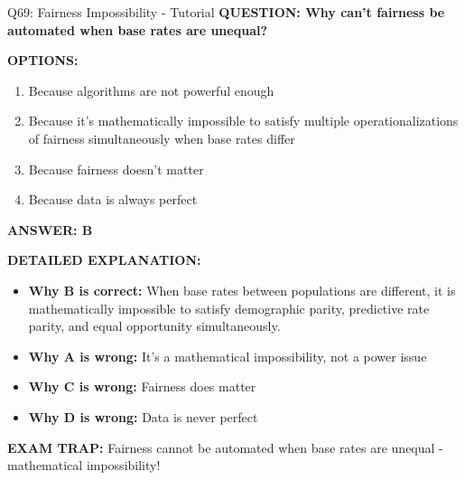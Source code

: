 \documentclass[8pt]{beamer}
\begin{document}
	\begin{frame}{Q69: Fairness Impossibility - Tutorial}
		\fontsize{6.5}{7.5}\selectfont
		\textbf{QUESTION: Why can't fairness be automated when base rates are unequal?}
		
		\vspace{0.1cm}
		\textbf{OPTIONS:}
		\begin{enumerate}
			\item Because algorithms are not powerful enough
			\item Because it's mathematically impossible to satisfy multiple operationalizations of fairness simultaneously when base rates differ
			\item Because fairness doesn't matter
			\item Because data is always perfect
		\end{enumerate}
		
		\vspace{0.1cm}
		\textcolor{myblue}{\textbf{ANSWER: B}}
		
		\vspace{0.1cm}
		\textbf{DETAILED EXPLANATION:}
		\begin{itemize}
			\item \textbf{Why B is correct:} When base rates between populations are different, it is mathematically impossible to satisfy demographic parity, predictive rate parity, and equal opportunity simultaneously.
			\item \textbf{Why A is wrong:} It's a mathematical impossibility, not a power issue
			\item \textbf{Why C is wrong:} Fairness does matter
			\item \textbf{Why D is wrong:} Data is never perfect
		\end{itemize}
		
		\textcolor{myred}{\textbf{EXAM TRAP:}} Fairness cannot be automated when \textcolor{myblue}{base rates are unequal} - mathematical impossibility!
	\end{frame}
	
\end{document}
